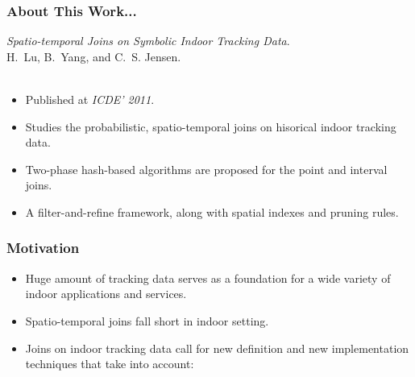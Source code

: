 \begin{frame}
\frametitle{About This Work...}

\emph{Spatio-temporal Joins on Symbolic Indoor Tracking Data}.~\cite{DBLP:conf/icde/LuYCJ11} \\
H.~Lu, B.~Yang, and C.~S. Jensen.\\~\\

\begin{itemize}
  \item Published at \emph{ICDE' 2011}.
  \item Studies the probabilistic, spatio-temporal joins on hisorical indoor tracking data.
  \item Two-phase hash-based algorithms are proposed for the point and interval joins.
  \item A filter-and-refine framework, along with spatial indexes and pruning rules.
\end{itemize}

\end{frame}

\begin{frame}
\frametitle{Motivation}

\begin{itemize}
  \item Huge amount of tracking data serves as a foundation for a wide variety of indoor applications and services.\cite{jensen2010indoor}

  \item Spatio-temporal joins fall short in indoor setting.

  \item Joins on indoor tracking data call for new definition and new implementation techniques that take into account:
\end{itemize}

\end{frame}

